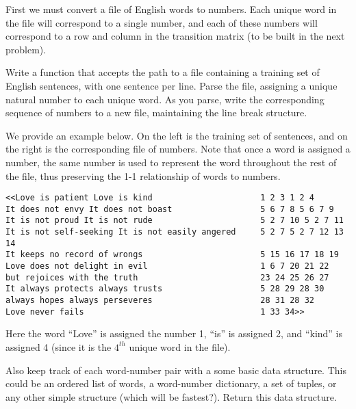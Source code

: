 \begin{problem}
First we must convert a file of English words to numbers.
Each unique word in the file will correspond to a single number, and each of these numbers will correspond to a row and column in the transition matrix (to be built in the next problem).

Write a function that accepts the path to a file containing a training set of English sentences, with one sentence per line.
Parse the file, assigning a unique natural number to each unique word.
As you parse, write the corresponding sequence of numbers to a new file, maintaining the line break structure.

We provide an example below.
On the left is the training set of sentences, and on the right is the corresponding file of numbers.
Note that once a word is assigned a number, the same number is used to represent the word throughout the rest of the file, thus preserving the 1-1 relationship of words to numbers.

\begin{lstlisting}
<<Love is patient Love is kind 						1 2 3 1 2 4 
It does not envy It does not boast 					5 6 7 8 5 6 7 9 
It is not proud It is not rude 						5 2 7 10 5 2 7 11 
It is not self-seeking It is not easily angered  	5 2 7 5 2 7 12 13 14 
It keeps no record of wrongs						5 15 16 17 18 19 
Love does not delight in evil						1 6 7 20 21 22 
but rejoices with the truth 						23 24 25 26 27 
It always protects always trusts 					5 28 29 28 30 
always hopes always perseveres 						28 31 28 32
Love never fails 									1 33 34>>
\end{lstlisting}

Here the word ``Love'' is assigned the number 1, ``is'' is assigned 2, and ``kind'' is assigned 4 (since it is the $4^{th}$ unique word in the file).

Also keep track of each word-number pair with a some basic data structure.
This could be an ordered list of words, a word-number dictionary, a set of tuples, or any other simple structure (which will be fastest?).
Return this data structure.

\begin{comment}
Also return a list that matches the index of the list to the word assigned that number, prepending and appending unique values for the start and stop states.
The list generated by the above example could be:
\begin{lstlisting}
<<[$tart, Love, is, patient, kind, It, does, not, ..., never, fails, en&]>>
\end{lstlisting}

Examine each line, one at a time.
Check each word in the line to see if it has been assigned a number yet.
If it hasn't, then assign the word a number and write the number into a new file.
If a number has been assigned already, write it to the new file.
The line break structure should be maintained.
\end{comment}
\label{problem:str_to_int}
\end{problem}

